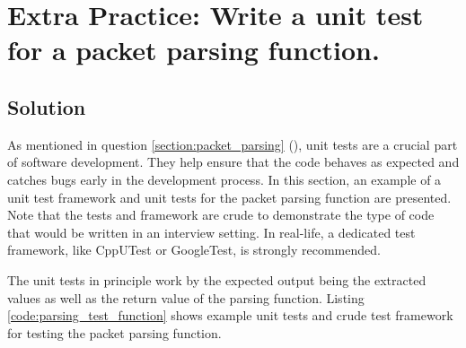 \documentclass[main.tex]{subfiles}
\begin{document}
\section{Extra Practice: Write a unit test for a packet parsing function.} \label{extra_practice:packet_parsing_tests}

\spoilerline

\subsection{Solution}
\noindent As mentioned in question \ref{section:packet_parsing} (\textit{}), unit tests are a crucial part of software development. They help ensure that the code behaves as expected and catches bugs early in the development process. In this section, an example of a unit test framework and unit tests for the packet parsing function are presented. Note that the tests and framework are crude to demonstrate the type of code that would be written in an interview setting. In real-life, a dedicated test framework, like CppUTest or GoogleTest, is strongly recommended. \newline

\newnoindentpara The unit tests in principle work by the expected output being the extracted values as well as the return value of the parsing function. Listing \ref{code:parsing_test_function} shows example unit tests and crude test framework for testing the packet parsing function.


\end{document}

